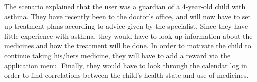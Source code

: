 The scenario explained that the user was a guardian of a 4-year-old child with asthma. They have recently been to the doctor's office, and will now have to set up treatment plans according to advice given by the specialist. Since they have little experience with asthma, they would have to look up information about the medicines and how the treatment will be done. In order to motivate the child to continue taking his/hers medicine, they will have to add a reward via the application menu. Finally, they would have to look through the calendar log in order to find correlations between the child's health state and use of medicines. 